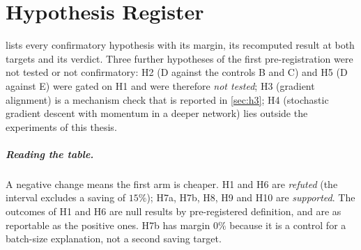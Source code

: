 \chapter{Hypothesis Register}\label{app:hypotheses}
 lists every confirmatory hypothesis with its margin, its recomputed result at both targets and its verdict. Three further hypotheses of the first pre-registration were not tested or not confirmatory: H2 (D against the controls B and C) and H5 (D against E) were gated on H1 and were therefore \emph{not tested}; H3 (gradient alignment) is a mechanism check that is reported in \cref{sec:h3}; H4 (stochastic gradient descent with momentum in a deeper network) lies outside the experiments of this thesis.

\begin{table}[h]
\centering\small
\caption{Confirmatory hypotheses. Intervals: $97.5\%$ for H1, H6, H7a, H7b and $98.3\%$ for H8--H10, paired bootstrap. A verdict needs both targets to agree (\cref{sec:stats}). The ``margin'' is the saving that must be exceeded for \emph{supported}.}
\label{tab:hyp}
\end{table}

\paragraph{Reading the table.} A negative change means the first arm is cheaper. H1 and H6 are \emph{refuted} (the interval excludes a saving of $15\%$); H7a, H7b, H8, H9 and H10 are \emph{supported}. The outcomes of H1 and H6 are null results by pre-registered definition, and are as reportable as the positive ones. H7b has margin $0\%$ because it is a control for a batch-size explanation, not a second saving target.
